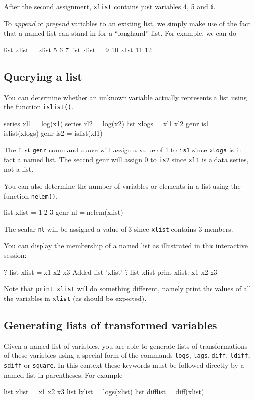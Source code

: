After the second assignment, \texttt{xlist} contains just variables 4,
5 and 6.

To \textit{append} or \textit{prepend} variables to an existing list,
we simply make use of the fact that a named list can stand in for a
``longhand'' list.  For example, we can do
%
\begin{code}
list xlist = xlist 5 6 7
list xlist = 9 10 xlist 11 12
\end{code}

\subsection{Querying a list}

You can determine whether an unknown variable actually represents a list
using the function \texttt{islist()}.
%
\begin{code}
series xl1 = log(x1)
series xl2 = log(x2)
list xlogs = xl1 xl2
genr is1 = islist(xlogs)
genr is2 = islist(xl1)
\end{code}

The first \texttt{genr} command above will assign a value of 1 to
\texttt{is1} since \texttt{xlogs} is in fact a named list.  The second
genr will assign 0 to \texttt{is2} since \texttt{xl1} is a data
series, not a list.  

You can also determine the number of variables or elements in a list
using the function \texttt{nelem()}.
%
\begin{code}
list xlist = 1 2 3
genr nl = nelem(xlist)
\end{code}

The scalar \texttt{nl} will be assigned a value of 3 since
\texttt{xlist} contains 3 members.

You can display the membership of a named list as illustrated in this
interactive session:
%
\begin{code}
? list xlist = x1 x2 x3
Added list 'xlist'
? list xlist print
 xlist: x1 x2 x3
\end{code}
%
Note that \texttt{print xlist} will do something different, namely
print the values of all the variables in \texttt{xlist} (as should be
expected).

\subsection{Generating lists of transformed variables}

Given a named list of variables, you are able to generate lists of
transformations of these variables using a special form of the
commands \texttt{logs}, \texttt{lags}, \texttt{diff}, \texttt{ldiff},
\texttt{sdiff} or \texttt{square}.  In this context these keywords
must be followed directly by a named list in parentheses.  For example
%
\begin{code}
list xlist = x1 x2 x3
list lxlist = logs(xlist)
list difflist = diff(xlist)
\end{code}

